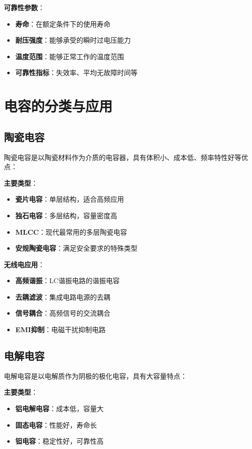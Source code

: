 \documentclass[12pt,UTF8]{ctexbook}
\begin{document}
\textbf{可靠性参数}：
\begin{itemize}[leftmargin=3.5em]
    \item \textbf{寿命}：在额定条件下的使用寿命
    \item \textbf{耐压强度}：能够承受的瞬时过电压能力
    \item \textbf{温度范围}：能够正常工作的温度范围
    \item \textbf{可靠性指标}：失效率、平均无故障时间等
\end{itemize}

\section{电容的分类与应用}

\subsection{陶瓷电容}

陶瓷电容是以陶瓷材料作为介质的电容器，具有体积小、成本低、频率特性好等优点：

\textbf{主要类型}：
\begin{itemize}[leftmargin=3.5em]
    \item \textbf{瓷片电容}：单层结构，适合高频应用
    \item \textbf{独石电容}：多层结构，容量密度高
    \item \textbf{MLCC}：现代最常用的多层陶瓷电容
    \item \textbf{安规陶瓷电容}：满足安全要求的特殊类型
\end{itemize}

\textbf{无线电应用}：
\begin{itemize}[leftmargin=3.5em]
    \item \textbf{高频谐振}：LC谐振电路的谐振电容
    \item \textbf{去耦滤波}：集成电路电源的去耦
    \item \textbf{信号耦合}：高频信号的交流耦合
    \item \textbf{EMI抑制}：电磁干扰抑制电路
\end{itemize}

\subsection{电解电容}

电解电容是以电解质作为阴极的极化电容，具有大容量特点：

\textbf{主要类型}：
\begin{itemize}[leftmargin=3.5em]
    \item \textbf{铝电解电容}：成本低，容量大
    \item \textbf{固态电容}：性能好，寿命长
    \item \textbf{钽电容}：稳定性好，可靠性高
\end{itemize}
\end{document}
